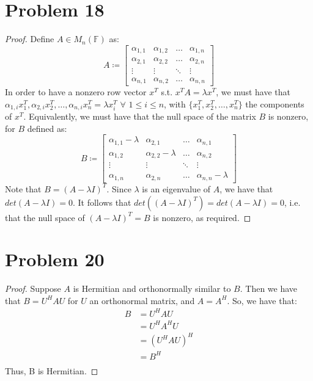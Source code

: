 \documentclass{article}
\begin{document}
\section*{Problem 18}

\begin{proof}
Define $A \in M_{n}(\mathbb{F})$ as:
$$A \coloneqq \begin{bmatrix} \alpha_{1, 1} & \alpha_{1, 2} & \dots &  \alpha_{1, n} \\
 \alpha_{2, 1} &  \alpha_{2, 2} & \dots &  \alpha_{2, n} \\
\vdots & \vdots & \ddots & \vdots \\
 \alpha_{n, 1} &  \alpha_{n, 2} & \dots &  \alpha_{n, n}\end{bmatrix}$$
In order to have a nonzero row vector $x^{T}$ s.t. $x^{T}A = \lambda x^{T}$, we must have that $\alpha_{1, i}x_1^{T}, \alpha_{2, i}x_2^{T}, \dots, \alpha_{n, i}x_n^{T} = \lambda x_i^{T}$ $\forall$ $1 \leq i \leq n$, with $\{x_1^{T}, x_2^{T}, \dots, x_n^{T}\}$ the components of $x^{T}$. Equivalently, we must have that the null space of the matrix $B$ is nonzero, for $B$ defined as:
$$B \coloneqq \begin{bmatrix} \alpha_{1, 1} - \lambda & \alpha_{2, 1} & \dots &  \alpha_{n, 1} \\
 \alpha_{1, 2} &  \alpha_{2, 2} - \lambda & \dots &  \alpha_{n, 2} \\
\vdots & \vdots & \ddots & \vdots \\
 \alpha_{1, n} &  \alpha_{2, n} & \dots &  \alpha_{n, n} - \lambda\end{bmatrix}$$
 Note that $B = (A - \lambda I)^{T}$. Since $\lambda$ is an eigenvalue of $A$, we have that $det(A - \lambda I) = 0$. It follows that $det((A - \lambda I)^{T}) = det(A - \lambda I) = 0$, i.e. that the null space of $(A - \lambda I)^{T} = B$ is nonzero, as required.
\end{proof}


\section*{Problem 20}

\begin{proof}
Suppose $A$ is Hermitian and orthonormally similar to $B$. Then we have that $B = U^{H}AU$ for $U$ an orthonormal matrix, and $A = A^{H}$. So, we have that:
\begin{align*}
B &= U^{H}AU \\
&= U^{H}A^{H}U \\
&= (U^{H}AU)^{H} \\
&= B^{H} \\
\end{align*}
Thus, B is Hermitian.
\end{proof}
\end{document}
